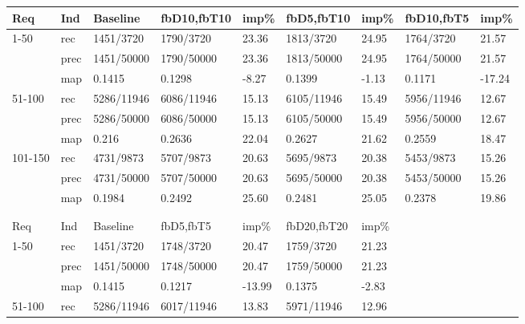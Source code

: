 \documentclass[a4paper]{article}
\begin{document}
\begin{table}[htp]
\centering
\begin{tabular}{|l|l|l|l|l|l|l|l|l|}
\hline
Req & Ind & Baseline    & fbD10,fbT10 & imp\%  & fbD5,fbT10  & imp\% & fbD10,fbT5 & imp\%  \\ \hline
1-50    & rec    & 1451/3720  & 1790/3720   & 23.36  & 1813/3720   & 24.95 & 1764/3720  & 21.57  \\ \hline
        & prec & 1451/50000 & 1790/50000  & 23.36  & 1813/50000  & 24.95 & 1764/50000 & 21.57  \\ \hline
        & map       & 0.1415     & 0.1298      & -8.27  & 0.1399      & -1.13 & 0.1171     & -17.24 \\ \hline
51-100  & rec    & 5286/11946 & 6086/11946  & 15.13  & 6105/11946  & 15.49 & 5956/11946 & 12.67  \\ \hline
        & prec & 5286/50000 & 6086/50000  & 15.13  & 6105/50000  & 15.49 & 5956/50000 & 12.67  \\ \hline
        & map       & 0.216      & 0.2636      & 22.04  & 0.2627      & 21.62 & 0.2559     & 18.47  \\ \hline
101-150 & rec    & 4731/9873  & 5707/9873   & 20.63  & 5695/9873   & 20.38 & 5453/9873  & 15.26  \\ \hline
        & prec & 4731/50000 & 5707/50000  & 20.63  & 5695/50000  & 20.38 & 5453/50000 & 15.26  \\ \hline
        & map       & 0.1984     & 0.2492      & 25.60  & 0.2481      & 25.05 & 0.2378     & 19.86  \\ \hline
        &           &            &             &          &             &         &            &          \\ \hline
        &           &            &             &          &             &         &            &          \\ \hline
Req & Ind & Baseline    & fbD5,fbT5   & imp\%  & fbD20,fbT20 & imp\% &            &          \\ \hline
1-50    & rec    & 1451/3720  & 1748/3720   & 20.47  & 1759/3720   & 21.23 &            &          \\ \hline
        & prec & 1451/50000 & 1748/50000  & 20.47  & 1759/50000  & 21.23 &            &          \\ \hline
        & map       & 0.1415     & 0.1217      & -13.99 & 0.1375      & -2.83 &            &          \\ \hline
51-100  & rec    & 5286/11946 & 6017/11946  & 13.83  & 5971/11946  & 12.96 &            &          \\ \hline

\end{tabular}
\end{table}
\end{document}
